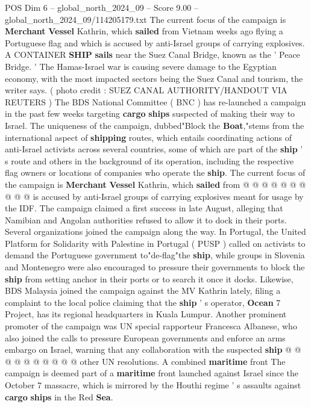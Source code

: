 \begin{textsample}{POS Dim 6 – global\_north\_2024\_09 – Score 9.00 – global\_north\_2024\_09/114205179.txt}  \label{ex:f6_pos_421}
The current focus of the campaign is \textbf{Merchant} \textbf{Vessel} Kathrin, which \textbf{sailed} from Vietnam weeks ago flying a Portuguese flag and which is accused by anti-Israel groups of carrying explosives.
A CONTAINER \textbf{SHIP} \textbf{sails} near the Suez Canal Bridge, known as the ' Peace Bridge. ' The Hamas-Israel war is causing severe damage to the Egyptian economy, with the most impacted sectors being the Suez Canal and tourism, the writer says. ( photo credit : SUEZ CANAL AUTHORITY/HANDOUT VIA REUTERS ) The BDS National Committee ( BNC ) has re-launched a campaign in the past few weeks targeting \textbf{cargo} \textbf{ships} suspected of making their way to Israel.
The uniqueness of the campaign, dubbed"Block the \textbf{Boat},"stems from the international aspect of \textbf{shipping} routes, which entails coordinating actions of anti-Israel activists across several countries, some of which are part of the \textbf{ship} ' s route and others in the background of its operation, including the respective flag owners or locations of companies who operate the \textbf{ship}.
The current focus of the campaign is \textbf{Merchant} \textbf{Vessel} Kathrin, which \textbf{sailed} from @ @ @ @ @ @ @ @ @ @ is accused by anti-Israel groups of carrying explosives meant for usage by the IDF.
The campaign claimed a first success in late August, alleging that Namibian and Angolan authorities refused to allow it to dock in their ports.
Several organizations joined the campaign along the way.
In Portugal, the United Platform for Solidarity with Palestine in Portugal ( PUSP ) called on activists to demand the Portuguese government to"de-flag"the \textbf{ship}, while groups in Slovenia and Montenegro were also encouraged to pressure their governments to block the \textbf{ship} from setting anchor in their ports or to search it once it docks.
Likewise, BDS Malaysia joined the campaign against the MV Kathrin lately, filing a complaint to the local police claiming that the \textbf{ship} ' s operator, \textbf{Ocean} 7 Project, has its regional headquarters in Kuala Lumpur.
Another prominent promoter of the campaign was UN special rapporteur Francesca Albanese, who also joined the calls to pressure European governments and enforce an arms embargo on Israel, warning that any collaboration with the suspected \textbf{ship} @ @ @ @ @ @ @ @ @ @ other UN resolutions.
A combined \textbf{maritime} front The campaign is deemed part of a \textbf{maritime} front launched against Israel since the October 7 massacre, which is mirrored by the Houthi regime ' s assaults against \textbf{cargo} \textbf{ships} in the Red \textbf{Sea}.

\end{textsample}
